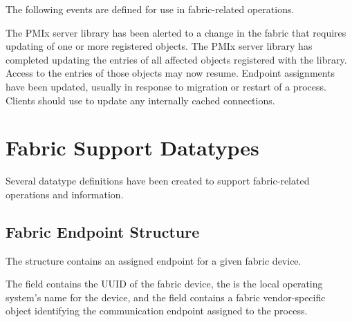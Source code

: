 The following events are defined for use in fabric-related operations.

\begin{constantdesc}
%
The \ac{PMIx} server library has been alerted to a change in the fabric that requires updating of one or more registered  objects.
%
The \ac{PMIx} server library has completed updating the entries of all affected  objects registered with the library. Access to the entries of those objects may now resume.
%
Endpoint assignments have been updated, usually in response to migration
or restart of a process. Clients should use  to update any
internally cached connections.
%
\end{constantdesc}

\section{Fabric Support Datatypes}

Several datatype definitions have been created to support fabric-related operations and information.

\subsection{Fabric Endpoint Structure}

The  structure contains an assigned endpoint for a given fabric device.


The  field contains the \ac{UUID} of the fabric device, the  is the local operating system's name for the device, and the  field contains a fabric vendor-specific object identifying the communication endpoint assigned to the process.


